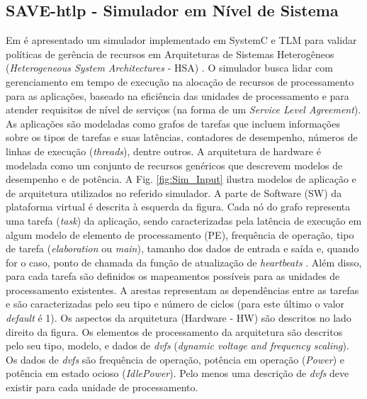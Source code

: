 \documentclass[tese-proposta,nocipinfo]{texufpel}
\begin{document}
\subsection{SAVE-htlp - Simulador em Nível de Sistema}\label{SAVE_htlp} 
Em \cite{miele2015system} é apresentado um simulador implementado em SystemC e TLM para validar políticas de gerência de recursos em Arquiteturas de Sistemas Heterogêneos (\textit{Heterogeneous System Architectures} - HSA) \cite{HSA_Foundation}. O simulador \cite{miele2015system} busca lidar com gerenciamento em tempo de execução na alocação de recursos de processamento para as aplicações, baseado na eficiência das unidades de processamento e para atender requisitos de nível de serviços (na forma de um \textit{Service Level Agreement}). As aplicações são modeladas como grafos de tarefas que incluem informações sobre os tipos de tarefas e suas latências, contadores de desempenho, números de linhas de execução (\textit{threads}), dentre outros. A arquitetura de hardware é modelada como um conjunto de recursos genéricos que descrevem modelos de desempenho e de potência. A Fig. \ref{fig:Sim_Input} ilustra modelos de aplicação e de arquitetura utilizados no referido simulador. A parte de Software (SW) da plataforma virtual é descrita à esquerda da figura. Cada nó do grafo representa uma tarefa (\textit{task}) da aplicação, sendo caracterizadas pela latência de execução em algum modelo de elemento de processamento (PE), frequência de operação, tipo de tarefa (\textit{elaboration} ou \textit{main}), tamanho dos dados de entrada e saída e, quando for o caso, ponto de chamada da função de atualização de \textit{heartbeats} \cite{Hoffmann:2010}. Além disso, para cada tarefa são definidos os mapeamentos possíveis para as unidades de processamento existentes. A arestas representam as dependências entre as tarefas e são caracterizadas pelo seu tipo e número de ciclos (para este último o valor \textit{default} é 1). Os aspectos da arquitetura (Hardware - HW) são descritos no lado direito da figura. Os elementos de processamento da arquitetura são descritos pelo seu tipo, modelo, e dados de \textit{dvfs} (\textit{dynamic voltage and frequency scaling}). Os dados de \textit{dvfs} são frequência de operação, potência em operação (\textit{Power}) e potência em estado ocioso (\textit{IdlePower}). Pelo menos uma descrição de \textit{dvfs} deve existir para cada unidade de processamento.
\end{document}
